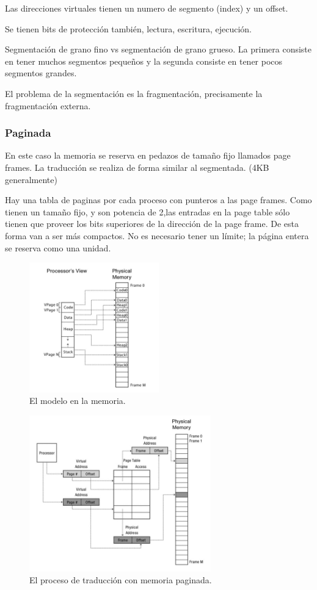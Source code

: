 \documentclass[titlepage,a4paper]{article}
\begin{document}
Las direcciones virtuales tienen un numero de segmento (index) y un offset.

Se tienen bits de protección también, lectura, escritura, ejecución.

Segmentación de grano fino vs segmentación de grano grueso. La primera consiste en tener muchos segmentos pequeños y la segunda consiste en tener pocos segmentos grandes.

El problema de la segmentación es la fragmentación, precisamente la fragmentación externa.

\subsubsection*{Paginada}
En este caso la memoria se reserva en pedazos de tamaño fijo llamados page frames. La traducción se realiza de forma similar al segmentada. (4KB generalmente)

Hay una tabla de paginas por cada proceso con punteros a las page frames. Como tienen un tamaño fijo, y son potencia de 2,las entradas en la page table sólo tienen que proveer los bits superiores de la dirección de la page frame. De esta forma van a ser más compactos. No es necesario tener un límite; la página entera se reserva como una unidad.

\begin{figure}[!htb]
    \centering
    \includegraphics[width=0.5\textwidth]{ImagenesApunte/logical_view_page_address.jpg}
    \caption{El modelo en la memoria.}
\end{figure}

\begin{figure}[!htb]
    \centering
    \includegraphics[width=0.7\textwidth]{ImagenesApunte/address_translation_with_page_table.jpg}
    \caption{El proceso de traducción con memoria paginada.}
\end{figure}
\end{document}
